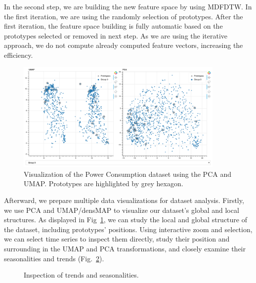 In the second step, we are building the new feature space by using MDFDTW. In the first iteration, we are using the randomly selection of prototypes. After the first iteration, the feature space building is fully automatic based on the prototypes selected or removed in next step. As we are using the iterative approach, we do not compute already computed feature vectors, increasing the efficiency.
\begin{figure}[htp]
    \centering
    \includegraphics[width=0.9\textwidth]{img/prototypes.png}
    \caption{Visualization of the Power Consumption dataset using the PCA and UMAP. Prototypes are highlighted by grey hexagon.}
    \label{fig:prototypes}
\end{figure}

Afterward, we prepare multiple data visualizations for dataset analysis. Firstly, we use PCA and UMAP/densMAP to visualize our dataset's global and local structures. As displayed in Fig~\ref{fig:prototypes}, we can study the local and global structure of the dataset, including prototypes' positions. Using interactive zoom and selection, we can select time series to inspect them directly, study their position and surrounding in the UMAP and PCA transformations, and closely examine their seasonalities and trends (Fig.~\ref{fig:selected-seasonalities}).
\begin{figure}[htp]
    \centering
    
    \caption{Inspection of trends and seasonalities.}
    \label{fig:selected-seasonalities}
\end{figure}

